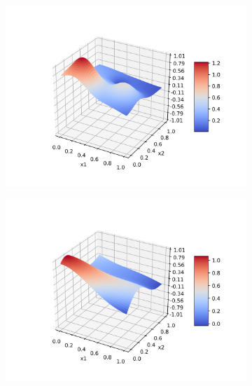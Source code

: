 \documentclass[a4paper]{article}
\numberwithin{equation}{section} %
\numberwithin{figure}{section} %
\numberwithin{table}{section} %
\theoremstyle{definition}
\begin{document}
\begin{figure}[H]
	\centering
	\begin{subfigure}{.32\textwidth}
		\centering
		\includegraphics[width=1.0\linewidth]{images/franke.png}
	\end{subfigure}
	\begin{subfigure}{.32\textwidth}
		\centering
		\includegraphics[width=1.0\linewidth]{images/MLP_N_75_sigma_3_rho_1e-05.png}
	\end{subfigure}
	\begin{subfigure}{.32\textwidth}
		\centering

\end{subfigure}
\end{figure}
\end{document}
